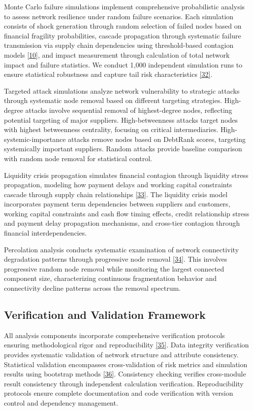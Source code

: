 \documentclass[a4 paper, 11pt,twoside]{article}
\newcommand{\0}{\Bf{0}}
\theoremstyle{definition}
\begin{document}
Monte Carlo failure simulations implement comprehensive probabilistic analysis to assess network resilience under random failure scenarios. Each simulation consists of shock generation through random selection of failed nodes based on financial fragility probabilities, cascade propagation through systematic failure transmission via supply chain dependencies using threshold-based contagion models \hyperref[ref10]{[10]}, and impact measurement through calculation of total network impact and failure statistics. We conduct 1,000 independent simulation runs to ensure statistical robustness and capture tail risk characteristics \hyperref[ref32]{[32]}.

Targeted attack simulations analyze network vulnerability to strategic attacks through systematic node removal based on different targeting strategies. High-degree attacks involve sequential removal of highest-degree nodes, reflecting potential targeting of major suppliers. High-betweenness attacks target nodes with highest betweenness centrality, focusing on critical intermediaries. High-systemic-importance attacks remove nodes based on DebtRank scores, targeting systemically important suppliers. Random attacks provide baseline comparison with random node removal for statistical control.

Liquidity crisis propagation simulates financial contagion through liquidity stress propagation, modeling how payment delays and working capital constraints cascade through supply chain relationships \hyperref[ref33]{[33]}. The liquidity crisis model incorporates payment term dependencies between suppliers and customers, working capital constraints and cash flow timing effects, credit relationship stress and payment delay propagation mechanisms, and cross-tier contagion through financial interdependencies.

Percolation analysis conducts systematic examination of network connectivity degradation patterns through progressive node removal \hyperref[ref34]{[34]}. This involves progressive random node removal while monitoring the largest connected component size, characterizing continuous fragmentation behavior and connectivity decline patterns across the removal spectrum.

\subsection{Verification and Validation Framework}

All analysis components incorporate comprehensive verification protocols ensuring methodological rigor and reproducibility \hyperref[ref35]{[35]}. Data integrity verification provides systematic validation of network structure and attribute consistency. Statistical validation encompasses cross-validation of risk metrics and simulation results using bootstrap methods \hyperref[ref36]{[36]}. Consistency checking verifies cross-module result consistency through independent calculation verification. Reproducibility protocols ensure complete documentation and code verification with version control and dependency management.
\end{document}

